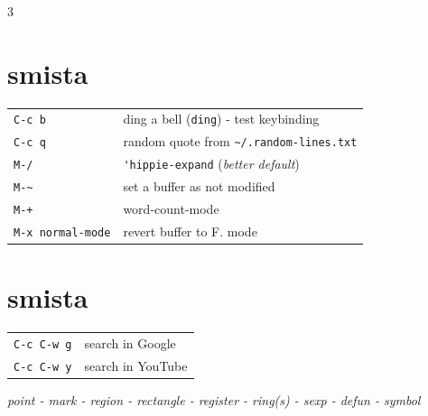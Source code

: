 \documentclass[11pt,landscape,a4paper]{article}
\begin{document}
\begin{multicols}{3}
\vfill\null

\section{smista}

\begin{tabular}{@{}ll@{}}
	{\color{darkred}\verb|C-c b|} 	& ding a bell (\verb|ding|) - test keybinding\\
	{\color{darkred}\verb|C-c q|} 	& random quote from \verb|~/.random-lines.txt|\\
	{\color{darkred}\verb|M-/|} 	& \verb|'hippie-expand| (\textit{better default})\\
	{\verb|M-~|} 		& set a buffer as not modified\\ %
	{\verb|M-+|} 		&  word-count-mode\\
	\verb|M-x normal-mode| & revert buffer to F. mode\\
\end{tabular}

\section{smista}

\begin{tabular}{@{}ll@{}}
	{\color{darkred}\verb|C-c C-w g|} 			& search in Google \\
	{\color{darkred}\verb|C-c C-w y|} 			& search in YouTube \\ 
\end{tabular}


\vspace*{1em}
\hline

\begin{center}
	{\color{bblue}\emph{point - mark - region - rectangle - register - ring(s) - sexp - defun - symbol}}
\end{center}





\end{multicols}
\end{document}
